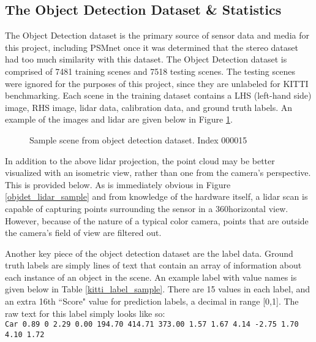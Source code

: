 \subsection{The Object Detection Dataset \& Statistics}
The Object Detection dataset is the primary source of sensor data and media for this project, including PSMnet once it was determined that the stereo dataset had too much similarity with this dataset. The Object Detection dataset is comprised of 7481 training scenes and 7518 testing scenes. The testing scenes were ignored for the purposes of this project, since they are unlabeled for KITTI benchmarking. Each scene in the training dataset contains a LHS (left-hand side) image, RHS image, lidar data, calibration data, and ground truth labels. An example of the images and lidar are given below in Figure \ref{objdet_sample}.

\begin{figure}[H]
    \centering
    \caption{Sample scene from object detection dataset. Index 000015}
    \label{objdet_sample}
\end{figure}

In addition to the above lidar projection, the point cloud may be better visualized with an isometric view, rather than one from the camera's perspective. This is provided below. As is immediately obvious in Figure \ref{objdet_lidar_sample} and from knowledge of the hardware itself, a lidar scan is capable of capturing points surrounding the sensor in a 360\deg horizontal view. However, because of the nature of a typical color camera, points that are outside the camera's field of view are filtered out.

Another key piece of the object detection dataset are the label data. Ground truth labels are simply lines of text that contain an array of information about each instance of an object in the scene. An example label with value names is given below in Table \ref{kitti_label_sample}. There are 15 values in each label, and an extra 16th ``Score" value for prediction labels, a decimal in range [0,1]. The raw text for this label simply looks like so: \\
\texttt{Car 0.89 0 2.29 0.00 194.70 414.71 373.00 1.57 1.67 4.14 -2.75 1.70 4.10 1.72} \\

